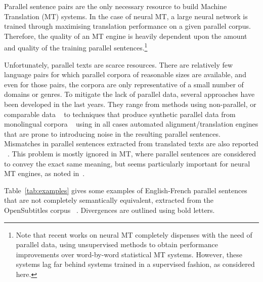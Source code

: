 \documentclass[11pt,a4paper]{article}
\begin{document}
Parallel sentence pairs are the only necessary resource to build Machine Translation (MT) systems.
In the case of neural MT, a large neural network is trained through maximising translation performance on a given parallel corpus. 
Therefore, the quality of an MT engine is heavily dependent upon the
amount and quality of the training parallel sentences.\footnote{Note
  that recent works on neural MT
  \cite{lample2018word,artetxe2018iclr} completely dispenses with the
  need of parallel data, using unsupervised methods to obtain performance
  improvements over word-by-word statistical MT systems. However, these systems
  lag far behind systems trained in a supervised fashion, as
  considered here.} 

Unfortunately, parallel texts are scarce resources. 
There are relatively few language pairs for which parallel corpora of
reasonable sizes are available, and even for those pairs, the corpora
are only representative of a small number of domains or genres. 
To mitigate the lack of parallel data, several approaches have been developed in the last years.
They range from methods using non-parallel, or comparable data ~\cite{Zhao:2002:APS:844380.844785,W04-3208,J05-4003,W17-2509,P17-3003} to techniques that produce synthetic parallel data from monolingual corpora ~\cite{P16-1009,W17-4714} using in all cases automated alignment/translation engines that are prone to introducing noise in the resulting parallel sentences. 
Mismatches in parallel sentences extracted from translated texts are also reported ~\cite{tiedemann2011bitext,XU16.310}. 
This problem is mostly ignored in MT, where parallel sentences are considered to convey the exact same meaning, but seems particularly important for neural MT engines, as noted in~\citet{chen2016adaptation}.

Table~\ref{tab:examples} gives some examples of English-French
parallel sentences that are not completely semantically equivalent, 
extracted from the OpenSubtitles corpus ~\cite{LisonTiedemann2016}. 
Divergences are outlined using bold letters. 
\end{document}
